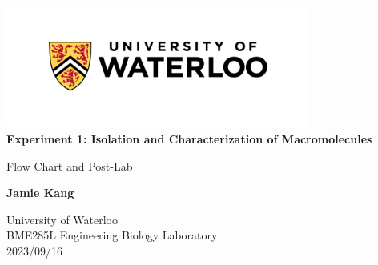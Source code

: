 \begin{titlepage}
    \begin{center}
        \vspace*{1in}
        \includegraphics[width = 10cm]{uw}\\[0.5cm]

        \Huge
        \textbf{Experiment 1: Isolation and Characterization of Macromolecules}
 
        \vspace{0.5cm}
        \LARGE
        Flow Chart and Post-Lab
             
        \vspace{1cm}
 
        \textbf{Jamie Kang}
 
        \vfill

        \Large
        University of Waterloo\\
        BME285L Engineering Biology Laboratory\\
        2023/09/16
             
    \end{center}
 \end{titlepage}